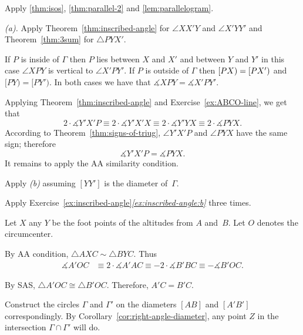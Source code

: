  Apply \ref{thm:isos}, \ref{thm:parallel-2} 
and \ref{lem:parallelogram}.

\setcounter{eqtn}{0}

 \textit{(a).}
Apply Theorem~\ref{thm:inscribed-angle} for $\angle XX'Y$ and $\angle X'YY'$
and Theorem~\ref{thm:3sum} for $\triangle PYX'$.

 If $P$ is inside of $\Gamma$ then $P$ lies between $X$ and $X'$ and between $Y$ and $Y'$ in this case $\angle XPY$ is vertical to $\angle X'PY'$.
If $P$ is outside of $\Gamma$ then $[PX)\z=[PX')$ and $[PY)=[PY')$.
In both cases we have that $\measuredangle XPY=\measuredangle X'PY'$.

Applying Theorem~\ref{thm:inscribed-angle} and Exercise~\ref{ex:ABCO-line}, we get that
\[2\cdot \measuredangle Y'X'P
\equiv
2\cdot \measuredangle Y'X'X 
\equiv
2\cdot\measuredangle Y'YX
\equiv
2\cdot\measuredangle PYX.\]
According to Theorem~\ref{thm:signs-of-triug}, $\angle Y'X'P$ and $\angle PYX$ have the same sign;
therefore
$$\measuredangle Y'X'P= \measuredangle PYX.$$
It remains to apply the AA similarity condition.

 Apply \textit{(b)} assuming $[YY']$ is the diameter of~$\Gamma$. 

 Apply Exercise~\ref{ex:inscribed-angle}\textit{\ref{ex:inscribed-angle:b}}
three times.

Let $X$ any $Y$ be the foot points of the altitudes from $A$ and~$B$.
Let $O$ denotes the circumcenter.
 
By AA condition, $\triangle A X C\sim \triangle B Y C$.
Thus 
\begin{align*}
\measuredangle A'OC
&\equiv 
2\cdot \measuredangle A' A C
\equiv-2\cdot\measuredangle B' B C
\equiv-\measuredangle B'OC.
\end{align*}

By SAS, $\triangle A'OC\cong\triangle B'OC$.
Therefore, $A'C=B'C$.

Construct the circles $\Gamma$ and $\Gamma'$
on the diameters $[AB]$ and $[A'B']$ correspondingly.
By Corollary~\ref{cor:right-angle-diameter},
any point $Z$ in the intersection $\Gamma\cap \Gamma'$ will do.


